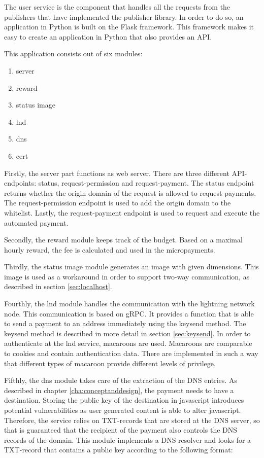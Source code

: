 The user service is the component that handles all the requests from the publishers that have implemented the publisher library. In order to do so, an application in Python is built on the Flask framework. This framework makes it easy to create an application in Python that also provides an API.

This application consists out of six modules:
\begin{enumerate}
  \item server
  \item reward
  \item status image
  \item lnd
  \item dns
  \item cert 
\end{enumerate}

Firstly, the server part functions as web server. There are three different API-endpoints: status, request-permission and request-payment. The status endpoint returns whether the origin domain of the request is allowed to request payments. The request-permission endpoint is used to add the origin domain to the whitelist. Lastly, the request-payment endpoint is used to request and execute the automated payment.

Secondly, the reward module keeps track of the budget. Based on a maximal hourly reward, the fee is calculated and used in the micropayments.

Thirdly, the status image module generates an image with given dimensions. This image is used as a workaround in order to support two-way communication, as described in section \ref{sec:localhost}.

Fourthly, the lnd module handles the communication with the lightning network node. This communication is based on gRPC. It provides a function that is able to send a payment to an address immediately using the keysend method. The keysend method is described in more detail in section \ref{sec:keysend}. In order to authenticate at the lnd service, macaroons are used. Macaroons are comparable to cookies and contain authentication data. There are implemented in such a way that different types of macaroon provide different levels of privilege. 

Fifthly, the dns module takes care of the extraction of the DNS entries. As described in chapter \ref{cha:conceptanddesign}, the payment needs to have a destination. Storing the public key of the destination in javascript introduces potential vulnerabilities as user generated content is able to alter javascript. Therefore, the service relies on TXT-records that are stored at the DNS server, so that is guaranteed that the recipient of the payment also controls the DNS records of the domain. This module implements a DNS resolver and looks for a TXT-record that contains a public key according to the following format:

